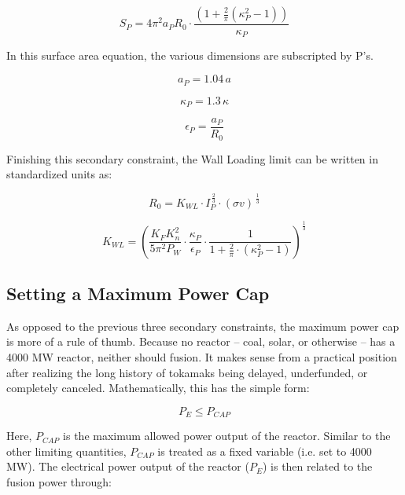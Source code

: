 \begin{equation}
	S_P = 4 \pi^2 a_P R_0 \cdot \frac{ \left( 1 + \frac{2}{\pi} \left( \kappa_P^2 -1 \right) \right) }{ \kappa_P }
\end{equation}

In this surface area equation, the various dimensions are subscripted by P's.

\begin{equation}
	a_P = 1.04 \, a
\end{equation}

\begin{equation}
	\kappa_P = 1.3 \, \kappa
\end{equation}

\begin{equation}
	\epsilon_P = \frac{a_P}{R_0}
\end{equation}

Finishing this secondary constraint, the Wall Loading limit can be written in standardized units as:

\begin{equation}
	R_0 = K_{WL} \cdot I_P^{ \, \frac{2}{3} } \cdot (\sigma v) ^{ \, \frac{1}{3} }
\end{equation}

\begin{equation}
	K_{WL} = \left( \frac{ K_F K_n^2 }{ 5 \pi^2 P_W } \cdot \frac{\kappa_P}{\epsilon_P} \cdot \frac{1}{1 + \frac{2}{\pi} \cdot ( \kappa_P^2 - 1 ) } \right) ^ { \frac{1}{3} }
\end{equation}

\subsection{Setting a Maximum Power Cap}

As opposed to the previous three secondary constraints, the maximum power cap is more of a rule of thumb. Because no reactor -- coal, solar, or otherwise -- has a 4000 MW reactor, neither should fusion. It makes sense from a practical position after realizing the long history of tokamaks being delayed, underfunded, or completely canceled. Mathematically, this has the simple form:

\begin{equation}
	P_E \le P_{CAP}
\end{equation}

Here, $P_{CAP}$ is the maximum allowed power output of the reactor. Similar to the other limiting quantities, $P_{CAP}$ is treated as a fixed variable (i.e. set to 4000 MW). The electrical power output of the reactor ($P_E$) is then related to the fusion power through:

